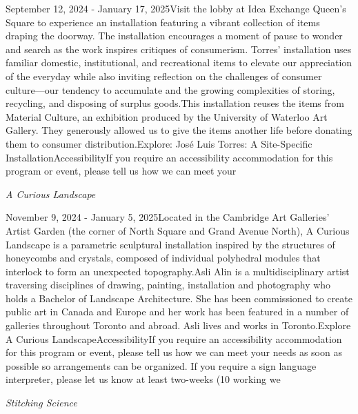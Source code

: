 \documentclass[letterpaper, 10pt]{article}
\newcommand{\subtitle}[1]{\textit{\large #1}\vspace{0.5em}}
\newcommand{\articlecontent}[1]{\small #1\vspace{1em}}
\begin{document}
\begin{multicols}{2}
{September 12, 2024 - January 17, 2025Visit the lobby at Idea Exchange Queen's Square to experience an installation featuring a vibrant collection of items draping the doorway. The installation encourages a moment of pause to wonder and search as the work inspires critiques of consumerism. Torres’ installation uses familiar domestic, institutional, and recreational items to elevate our appreciation of the everyday while also inviting reflection on the challenges of consumer culture—our tendency to accumulate and the growing complexities of storing, recycling, and disposing of surplus goods.This installation reuses the items from Material Culture, an exhibition produced by the University of Waterloo Art Gallery. They generously allowed us to give the items another life before donating them to consumer distribution.Explore: José Luis Torres: A Site-Specific InstallationAccessibilityIf you require an accessibility accommodation for this program or event, please tell us how we can meet your
}
\vspace{10px}

\subtitle{A Curious Landscape}

\articlecontent{

\qrcode[height=1.5cm]{https://ideaexchange.libnet.info/event/12212317}
\vspace{10px}

November 9, 2024 - January 5, 2025Located in the Cambridge Art Galleries' Artist Garden (the corner of North Square and Grand Avenue North), A Curious Landscape is a parametric sculptural installation inspired by the structures of honeycombs and crystals, composed of individual polyhedral modules that interlock to form an unexpected topography.Asli Alin is a multidisciplinary artist traversing disciplines of drawing, painting, installation and photography who holds a Bachelor of Landscape Architecture. She has been commissioned to create public art in Canada and Europe and her work has been featured in a number of galleries throughout Toronto and abroad. Asli lives and works in Toronto.Explore A Curious LandscapeAccessibilityIf you require an accessibility accommodation for this program or event, please tell us how we can meet your needs as soon as possible so arrangements can be organized. If you require a sign language interpreter, please let us know at least two-weeks (10 working we
}
\vspace{10px}

\subtitle{Stitching Science}

\articlecontent{

}
\end{multicols}
\end{document}
